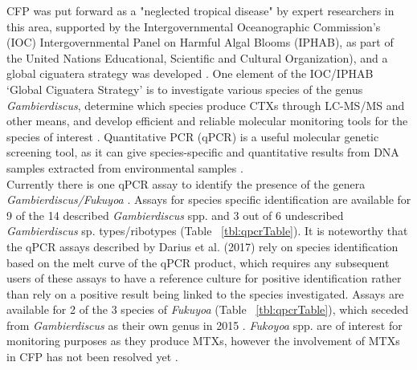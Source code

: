 \documentclass[12pt]{article}
\begin{document}
CFP was put forward as a "neglected tropical disease" by expert researchers in this area, supported by the Intergovernmental Oceanographic Commission’s (IOC) Intergovernmental Panel on Harmful Algal Blooms (IPHAB), as part of the United Nations Educational, Scientific and Cultural Organization), and a global ciguatera strategy was developed \citep{globalcig}. 
One element of the IOC/IPHAB ‘Global Ciguatera Strategy’ is to  investigate various species of the genus \emph{Gambierdiscus}, determine which species produce CTXs through LC-MS/MS and other means, and develop efficient and reliable molecular monitoring tools for the species of interest \citep{globalcig}. 
Quantitative PCR (qPCR) is a useful molecular genetic screening tool, as it can give species-specific and quantitative results from DNA samples extracted from environmental samples \citep{globalcig}. \\
\FloatBarrier
\FloatBarrier
Currently there is one qPCR assay to identify the presence of the genera \emph{Gambierdiscus/Fukuyoa} \citep{smith2017molecular}. 
Assays for species specific identification are available for 9 of the 14 described \emph{Gambierdiscus} spp. and 3 out of 6 undescribed \emph{Gambierdiscus} sp. types/ribotypes (Table ~\ref{tbl:qpcrTable}). 
It is noteworthy that the qPCR assays described by Darius et al. (2017) rely on species identification based on the melt curve of the qPCR product, which requires any subsequent users of these assays to have a reference culture for positive identification rather than rely on a positive result being linked to the species investigated. 
Assays are available for 2 of the 3 species of \emph{Fukuyoa} (Table ~\ref{tbl:qpcrTable}), which seceded from \emph{Gambierdiscus} as their own genus in 2015 \citep{gomez2015fukuyoa}. 
\textit{Fukoyoa} spp. are of interest for monitoring purposes as they produce MTXs, however the involvement of MTXs in CFP has not been resolved yet \citep{kohli2014feeding}.
\end{document}
